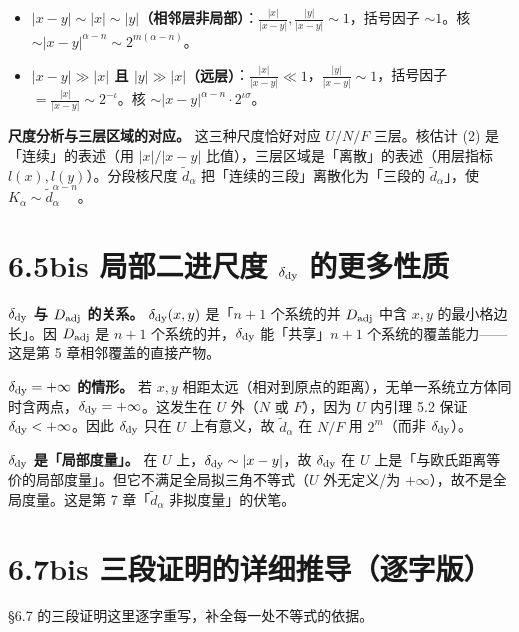 \documentclass[a4paper,11pt,openany]{ctexbook}
\numberwithin{equation}{chapter}
\numberwithin{figure}{chapter}
\numberwithin{table}{chapter}
\begin{document}
\begin{itemize}
\item \textbf{$|x-y|\sim|x|\sim|y|$（相邻层非局部）}：$\frac{|x|}{|x-y|},\frac{|y|}{|x-y|}\sim1$，括号因子 $\sim1$。核 $\sim|x-y|^{\alpha-n}\sim2^{m(\alpha-n)}$。
\end{itemize}

\begin{itemize}
\item \textbf{$|x-y|\gg|x|$ 且 $|y|\gg|x|$（远层）}：$\frac{|x|}{|x-y|}\ll1$，$\frac{|y|}{|x-y|}\sim1$，括号因子 $=\frac{|x|}{|x-y|}\sim2^{-\iota}$。核 $\sim|x-y|^{\alpha-n}\cdot2^{\iota\sigma}$。
\end{itemize}

\textbf{尺度分析与三层区域的对应。} 这三种尺度恰好对应 $U/N/F$ 三层。核估计 (2) 是「连续」的表述（用 $|x|/|x-y|$ 比值），三层区域是「离散」的表述（用层指标 $l(x),l(y)$）。分段核尺度 $\widetilde d_\alpha$ 把「连续的三段」离散化为「三段的 $\widetilde d_\alpha$」，使 $K_\alpha\sim\widetilde d_\alpha^{\alpha-n}$。

\section{6.5bis 局部二进尺度 $\delta_{\rm dy}$ 的更多性质}

\textbf{$\delta_{\rm dy}$ 与 $D_{\rm adj}$ 的关系。} $\delta_{\rm dy}(x,y)$ 是「$n+1$ 个系统的并 $D_{\rm adj}$ 中含 $x,y$ 的最小格边长」。因 $D_{\rm adj}$ 是 $n+1$ 个系统的并，$\delta_{\rm dy}$ 能「共享」$n+1$ 个系统的覆盖能力——这是第 5 章相邻覆盖的直接产物。

\textbf{$\delta_{\rm dy}=+\infty$ 的情形。} 若 $x,y$ 相距太远（相对到原点的距离），无单一系统立方体同时含两点，$\delta_{\rm dy}=+\infty$。这发生在 $U$ 外（$N$ 或 $F$），因为 $U$ 内引理 5.2 保证 $\delta_{\rm dy}<+\infty$。因此 $\delta_{\rm dy}$ 只在 $U$ 上有意义，故 $\widetilde d_\alpha$ 在 $N/F$ 用 $2^{m}$（而非 $\delta_{\rm dy}$）。

\textbf{$\delta_{\rm dy}$ 是「局部度量」。} 在 $U$ 上，$\delta_{\rm dy}\sim|x-y|$，故 $\delta_{\rm dy}$ 在 $U$ 上是「与欧氏距离等价的局部度量」。但它不满足全局拟三角不等式（$U$ 外无定义/为 $+\infty$），故不是全局度量。这是第 7 章「$\widetilde d_\alpha$ 非拟度量」的伏笔。

\section{6.7bis 三段证明的详细推导（逐字版）}

§6.7 的三段证明这里逐字重写，补全每一处不等式的依据。
\end{document}
